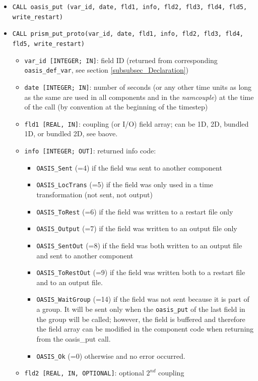 \begin{itemize}
\item {\tt CALL oasis\_put (var\_id, date, fld1, info, fld2, fld3,
    fld4, fld5, write\_restart)}
\item {\tt CALL prism\_put\_proto(var\_id, date, fld1, info, fld2,
    fld3, fld4, fld5, write\_restart)}
  \begin{itemize}
  \item {\tt var\_id [INTEGER; IN]}: field ID (returned from corresponding {\tt
      oasis\_def\_var}, see section \ref{subsubsec_Declaration})
  \item {\tt date [INTEGER; IN]}: number of seconds (or any other time
    units as long as the same are used in all components and in the {\it
      namcouple}) at the time of the call (by convention at the
    beginning of the timestep)
  \item {\tt fld1 [REAL, IN]}: coupling (or I/O) field array; can be
    1D, 2D, bundled 1D, or bundled 2D, see baove. 
  \item {\tt info [INTEGER; OUT]}: returned info code:
    \begin{itemize}
    \item {\tt OASIS\_Sent} (=4) if the field was sent to another component
    \item {\tt OASIS\_LocTrans} (=5) if the field was only used in a time
      transformation (not sent, not output)
    \item {\tt OASIS\_ToRest} (=6) if the field was written to a restart
      file only
    \item {\tt OASIS\_Output} (=7) if the field was written to an output
      file only
    \item {\tt OASIS\_SentOut} (=8) if the field was both written to an
      output file and sent to another component 
    \item {\tt OASIS\_ToRestOut} (=9) if the field was written both to a
      restart file and to an output file.
    \item {\tt OASIS\_WaitGroup} (=14) if the field was not sent because it is part of a group.
    It will be sent only when the {\tt oasis\_put} of the last field in the group will be called; however, the field is buffered and therefore the field array can be modified in the component code when returning from the oasis\_put call.
    \item {\tt OASIS\_Ok} (=0) otherwise and no error occurred.
    \end{itemize}
  \item {\tt fld2 [REAL, IN, OPTIONAL]}: optional $2^{nd}$ coupling

\end{itemize}
\end{itemize}
